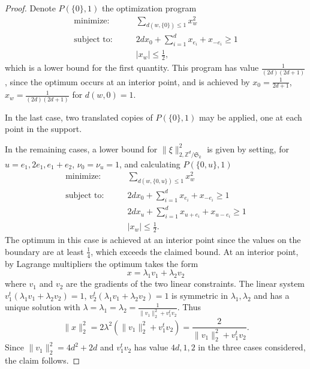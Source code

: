 \documentclass[a4paper, 12pt, notitlepage]{amsart}
\newcommand{\zed}{\mathbb{Z}}
\newcommand{\fS}{{\mathfrak{S}}}
\theoremstyle{remark}
\begin{document}
\begin{proof}
 Denote $P(\{0\}, 1)$ the optimization program
 \begin{align*}
\text{minimize:} &\qquad  \sum_{d(w, \{0\}) \leq 1} x_w^2\\
\text{subject to:} &\qquad 2dx_0 + \sum_{i=1}^d x_{e_i} + x_{-e_i} \geq 1\\ &\qquad |x_w| \leq \frac{1}{2},
\end{align*}
 which is a lower bound for the first quantity.  This program has value $\frac{1}{(2d)(2d+1)}$, since the optimum occurs at an interior point, and is achieved by $x_0 = \frac{1}{2d+1}$, $x_w = \frac{1}{(2d)(2d+1)}$ for $d(w,0)=1$.  

 In the last case, two translated copies of $P(\{0\}, 1)$ may be applied, one at each point in the support.
 
 
In the remaining cases, a lower bound for $\|\xi\|_{2, \zed^d/\fS_k}^2$ is given by setting, for $u = e_1, 2e_1, e_1 + e_2$, $\nu_0 = \nu_u = 1$, and calculating  $P(\{0, u\}, 1)$
\begin{align*}
\text{minimize:} &\qquad  \sum_{d(w, \{0, u\}) \leq 1} x_w^2\\
\text{subject to:} &\qquad 2dx_0 + \sum_{i=1}^d x_{e_i} + x_{-e_i} \geq 1\\
&\qquad 2d x_{u} + \sum_{i=1}^d x_{u + e_i} + x_{u-e_i}\geq 1\\
& \qquad |x_w| \leq \frac{1}{2}.
\end{align*}
The optimum in this case is achieved at an interior point since the values on the boundary are at least $\frac{1}{4}$, which exceeds the claimed bound. At an interior point, by Lagrange multipliers the optimum takes the form
 \begin{equation}
  x = \lambda_1 v_1 + \lambda_2 v_2
 \end{equation}
where $v_1$ and $v_2$ are the gradients of the two linear constraints. The linear system $v_1^t (\lambda_1 v_1 + \lambda_2 v_2) = 1$, $v_2^t (\lambda_1 v_1 + \lambda_2 v_2) = 1$ is symmetric in $\lambda_1, \lambda_2$ and has a unique solution with $\lambda=\lambda_1 = \lambda_2 = \frac{1}{\|v_1\|_2^2 + v_1^t v_2}$.  Thus
\begin{equation}
 \|x\|_2^2 = 2\lambda^2 (\|v_1\|_2^2 + v_1^t v_2) = \frac{2}{\|v_1\|_2^2 + v_1^t v_2}. 
\end{equation}
Since $\|v_1\|_2^2 = 4d^2 +2d$ and $v_1^t v_2$ has value $4d, 1, 2$ in the three cases considered, the claim follows.
 
 
\end{proof}
\end{document}

